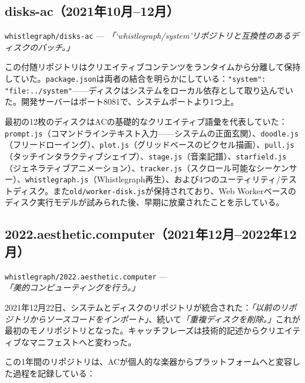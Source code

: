 \documentclass[10pt,letterpaper,twocolumn]{article}
\begin{document}
\subsection{disks-ac（2021年10月--12月）}

\texttt{whistlegraph/disks-ac} --- \emph{「`whistlegraph/system'リポジトリと互換性のあるディスクのバッチ。」}

この付随リポジトリはクリエイティブコンテンツをランタイムから分離して保持していた。\texttt{package.json}は両者の結合を明らかにしている：\texttt{"system": "file:../system"}——ディスクはシステムをローカル依存として取り込んでいた。開発サーバーはポート8081で、システムポートより1つ上。

最初の12枚のディスクはACの基礎的なクリエイティブ語彙を代表していた：\texttt{prompt.js}（コマンドラインテキスト入力——システムの正面玄関）、\texttt{doodle.js}（フリードローイング）、\texttt{plot.js}（グリッドベースのピクセル描画）、\texttt{pull.js}（タッチインタラクティブシェイプ）、\texttt{stage.js}（音楽記譜）、\texttt{starfield.js}（ジェネラティブアニメーション）、\texttt{tracker.js}（スクロール可能なシーケンサー）、\texttt{whistlegraph.js}（Whistlegraph再生）、および4つのユーティリティ/テストディスク。また\texttt{old/worker-disk.js}が保持されており、Web Workerベースのディスク実行モデルが試みられた後、早期に放棄されたことを示している。

\subsection{2022.aesthetic.computer（2021年12月--2022年12月）}

\texttt{whistlegraph/2022.aesthetic.computer} --- \emph{「美的コンピューティングを行う。」}

2021年12月22日、システムとディスクのリポジトリが統合された：\emph{「以前のリポジトリからソースコードをインポート」}、続いて\emph{「重複ディスクを削除。」}これが最初のモノリポジトリとなった。キャッチフレーズは技術的記述からクリエイティブなマニフェストへと変わった。

この1年間のリポジトリは、ACが個人的な楽器からプラットフォームへと変容した過程を記録している：
\end{document}

